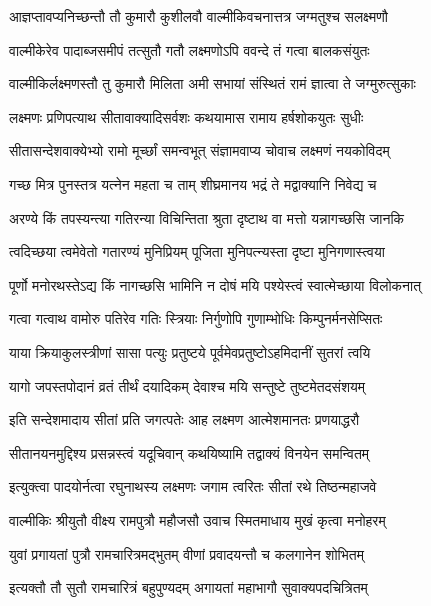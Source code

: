 \twolineshloka
{आज्ञप्तावप्यनिच्छन्तौ तौ कुमारौ कुशीलवौ}
{वाल्मीकिवचनात्तत्र जग्मतुश्च सलक्ष्मणौ}%

\twolineshloka
{वाल्मीकेरेव पादाब्जसमीपं तत्सुतौ गतौ}
{लक्ष्मणोऽपि ववन्दे तं गत्वा बालकसंयुतः}%

\twolineshloka
{वाल्मीकिर्लक्ष्मणस्तौ तु कुमारौ मिलिता अमी}
{सभायां संस्थितं रामं ज्ञात्वा ते जग्मुरुत्सुकाः}%

\twolineshloka
{लक्ष्मणः प्रणिपत्याथ सीतावाक्यादिसर्वशः}
{कथयामास रामाय हर्षशोकयुतः सुधीः}%

\twolineshloka
{सीतासन्देशवाक्येभ्यो रामो मूर्च्छां समन्वभूत्}
{संज्ञामवाप्य चोवाच लक्ष्मणं नयकोविदम्}%

\twolineshloka
{गच्छ मित्र पुनस्तत्र यत्नेन महता च ताम्}
{शीघ्रमानय भद्रं ते मद्वाक्यानि निवेद्य च}%

\twolineshloka
{अरण्ये किं तपस्यन्त्या गतिरन्या विचिन्तिता}
{श्रुता दृष्टाथ वा मत्तो यन्नागच्छसि जानकि}%

\twolineshloka
{त्वदिच्छया त्वमेवेतो गतारण्यं मुनिप्रियम्}
{पूजिता मुनिपत्न्यस्ता दृष्टा मुनिगणास्त्वया}%

\twolineshloka
{पूर्णो मनोरथस्तेऽद्य किं नागच्छसि भामिनि}
{न दोषं मयि पश्येस्त्वं स्वात्मेच्छाया विलोकनात्}%

\twolineshloka
{गत्वा गत्वाथ वामोरु पतिरेव गतिः स्त्रियाः}
{निर्गुणोपि गुणाम्भोधिः किम्पुनर्मनसेप्सितः}%

\twolineshloka
{याया क्रियाकुलस्त्रीणां सासा पत्युः प्रतुष्टये}
{पूर्वमेवप्रतुष्टोऽहमिदानीं सुतरां त्वयि}%

\twolineshloka
{यागो जपस्तपोदानं व्रतं तीर्थं दयादिकम्}
{देवाश्च मयि सन्तुष्टे तुष्टमेतदसंशयम्}%


\twolineshloka
{इति सन्देशमादाय सीतां प्रति जगत्पतेः}
{आह लक्ष्मण आत्मेशमानतः प्रणयाद्धरौ}%

\twolineshloka
{सीतानयनमुद्दिश्य प्रसन्नस्त्वं यदूचिवान्}
{कथयिष्यामि तद्वाक्यं विनयेन समन्वितम्}%

\twolineshloka
{इत्युक्त्वा पादयोर्नत्वा रघुनाथस्य लक्ष्मणः}
{जगाम त्वरितः सीतां रथे तिष्ठन्महाजवे}%

\twolineshloka
{वाल्मीकिः श्रीयुतौ वीक्ष्य रामपुत्रौ महौजसौ}
{उवाच स्मितमाधाय मुखं कृत्वा मनोहरम्}%

\twolineshloka
{युवां प्रगायतां पुत्रौ रामचारित्रमद्भुतम्}
{वीणां प्रवादयन्तौ च कलगानेन शोभितम्}%

\twolineshloka
{इत्यक्तौ तौ सुतौ रामचारित्रं बहुपुण्यदम्}
{अगायतां महाभागौ सुवाक्यपदचित्रितम्}%

